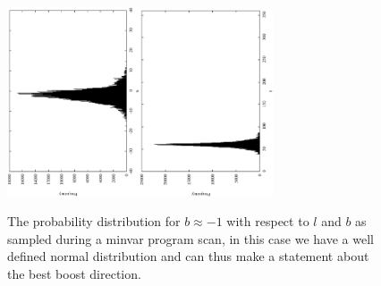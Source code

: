 \documentclass[11pt]{article}
\begin{document}
\newpage
\begin{figure}
\includegraphics[width=0.35\textwidth,angle=-90]{hist_b.eps}\includegraphics[width=0.35\textwidth,angle=-90]{hist_l.eps}\label{fig:hist}
\caption{The probability distribution for $b\approx-1$ with respect to $l$ and $b$ as sampled during a minvar program scan, in this case we have a well defined normal distribution and can thus make a statement about the best boost direction.}
\end{figure}
\end{document}
